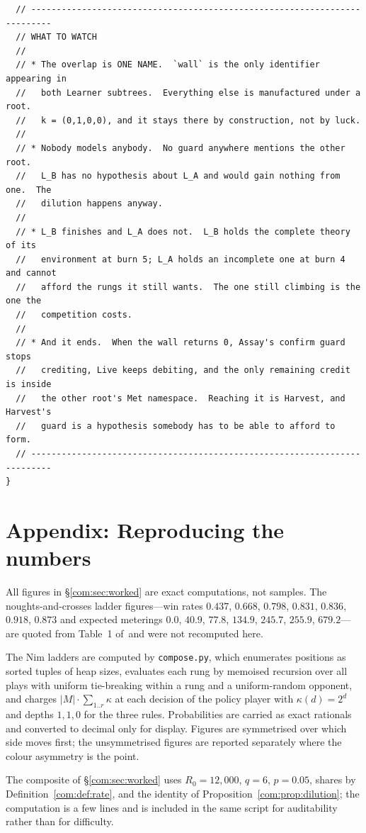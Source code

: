 \begin{lstlisting}
  // --------------------------------------------------------------------------
  // WHAT TO WATCH
  //
  // * The overlap is ONE NAME.  `wall` is the only identifier appearing in
  //   both Learner subtrees.  Everything else is manufactured under a root.
  //   k = (0,1,0,0), and it stays there by construction, not by luck.
  //
  // * Nobody models anybody.  No guard anywhere mentions the other root.
  //   L_B has no hypothesis about L_A and would gain nothing from one.  The
  //   dilution happens anyway.
  //
  // * L_B finishes and L_A does not.  L_B holds the complete theory of its
  //   environment at burn 5; L_A holds an incomplete one at burn 4 and cannot
  //   afford the rungs it still wants.  The one still climbing is the one the
  //   competition costs.
  //
  // * And it ends.  When the wall returns 0, Assay's confirm guard stops
  //   crediting, Live keeps debiting, and the only remaining credit is inside
  //   the other root's Met namespace.  Reaching it is Harvest, and Harvest's
  //   guard is a hypothesis somebody has to be able to afford to form.
  // --------------------------------------------------------------------------
}
\end{lstlisting}

\section{Appendix: Reproducing the numbers}\label{com:app:repro}\label{com:S17}

All figures in \S\ref{com:sec:worked} are exact computations, not samples. The noughts-and-crosses
ladder figures---win rates $0.437$, $0.668$, $0.798$, $0.831$, $0.836$, $0.918$, $0.873$ and
expected meterings $0.0$, $40.9$, $77.8$, $134.9$, $245.7$, $255.9$, $679.2$---are quoted from
Table~1
of~\chGame and were not recomputed here.

The Nim ladders are computed by \texttt{compose.py}, which enumerates positions as sorted tuples
of heap sizes, evaluates each rung by memoised recursion over all plays with uniform tie-breaking
within a rung and a uniform-random opponent, and charges $|M| \cdot \sum_{1..r} \kappa$ at each
decision of the policy player with $\kappa(d) = 2^d$ and depths $1, 1, 0$ for the three rules.
Probabilities are carried as exact rationals and converted to decimal only for display. Figures
are symmetrised over which side moves first; the unsymmetrised figures are reported separately
where the colour asymmetry is the point.

The composite of \S\ref{com:sec:worked} uses $R_0 = 12{,}000$, $q = 6$, $p = 0.05$, shares by
Definition~\ref{com:def:rate}, and the identity of Proposition~\ref{com:prop:dilution}; the
computation is a few lines and is included in the same script for auditability rather than for
difficulty.

